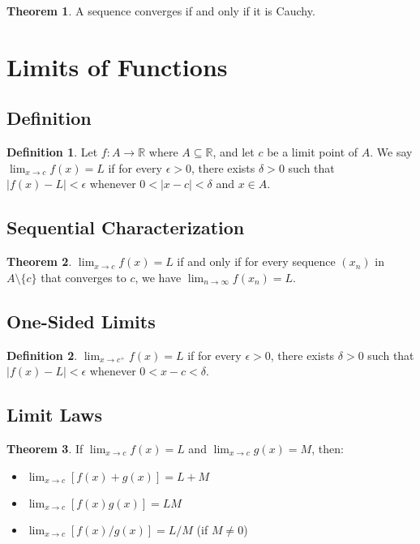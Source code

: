 \documentclass[11pt]{article}
\theoremstyle{definition}
\newtheorem{definition}{Definition}[section]
\newtheorem{theorem}{Theorem}[section]
\begin{document}
\begin{theorem}
A sequence converges if and only if it is Cauchy.
\end{theorem}

\section{Limits of Functions}

\subsection{Definition}
\begin{definition}
Let $f: A \to \mathbb{R}$ where $A \subseteq \mathbb{R}$, and let $c$ be a limit point of $A$. We say $\lim_{x \to c} f(x) = L$ if for every $\epsilon > 0$, there exists $\delta > 0$ such that $|f(x) - L| < \epsilon$ whenever $0 < |x - c| < \delta$ and $x \in A$.
\end{definition}

\subsection{Sequential Characterization}
\begin{theorem}
$\lim_{x \to c} f(x) = L$ if and only if for every sequence $(x_n)$ in $A \setminus \{c\}$ that converges to $c$, we have $\lim_{n \to \infty} f(x_n) = L$.
\end{theorem}

\subsection{One-Sided Limits}
\begin{definition}
$\lim_{x \to c^+} f(x) = L$ if for every $\epsilon > 0$, there exists $\delta > 0$ such that $|f(x) - L| < \epsilon$ whenever $0 < x - c < \delta$.
\end{definition}

\subsection{Limit Laws}
\begin{theorem}
If $\lim_{x \to c} f(x) = L$ and $\lim_{x \to c} g(x) = M$, then:
\begin{itemize}
    \item $\lim_{x \to c} [f(x) + g(x)] = L + M$
    \item $\lim_{x \to c} [f(x)g(x)] = LM$
    \item $\lim_{x \to c} [f(x)/g(x)] = L/M$ (if $M \neq 0$)
\end{itemize}
\end{theorem}
\end{document}
